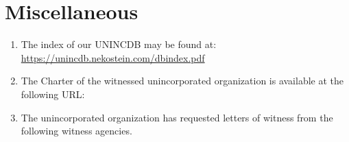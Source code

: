 \section{Miscellaneous}
\begin{enumerate}
    \item The index of our UNINCDB may be found at:\\
        \href{https://unincdb.nekostein.com/dbindex.pdf}{https://unincdb.nekostein.com/dbindex.pdf}
    \item The Charter of the witnessed unincorporated organization is available at the following URL:\\
        
    \item The unincorporated organization has requested letters of witness from the following witness agencies.
    \begin{itemize}
        
    \end{itemize}
\end{enumerate}

\hsepline








